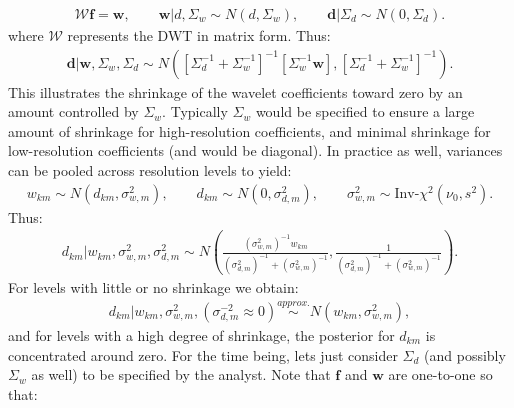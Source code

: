 \documentclass[a4paper,11pt]{article}
\newcommand{\simapprox}{\stackrel{approx.}{\sim}}
\begin{document}
\begin{align*}
 \mathcal{W}\mathbf{f} = \mathbf{w} , \qquad 
  \mathbf{w}|d,\Sigma_{w} \sim N\left(d,\Sigma_{w}\right) , \qquad
  \mathbf{d}|\Sigma_{d} \sim N\left(0,\Sigma_{d}\right) .
\end{align*}
where $\mathcal{W}$ represents the DWT in matrix form. Thus:
\begin{align*}
  \mathbf{d} | \mathbf{w}, \Sigma_{w}, \Sigma_{d} \sim
   N\left(\left[\Sigma_{d}^{-1}+\Sigma_{w}^{-1}\right]^{-1}\left[\Sigma_{w}^{-1}\mathbf{w}\right],\left[\Sigma_{d}^{-1}+\Sigma_{w}^{-1}\right]^{-1}\right) .
\end{align*}
This illustrates the shrinkage of the wavelet coefficients toward zero by an amount controlled by $\Sigma_{w}$. Typically $\Sigma_{w}$ would be specified to ensure a large amount of shrinkage for high-resolution coefficients, and minimal shrinkage for low-resolution coefficients (and would be diagonal). In practice as well, variances can be pooled across resolution levels to yield: 
\begin{align*}
  w_{km} \sim N\left(d_{km},\sigma^{2}_{w,m}\right) , \qquad
  d_{km} \sim N\left(0,\sigma^{2}_{d,m}\right) , \qquad 
  \sigma^{2}_{w,m} \sim \textrm{Inv-}\chi^{2}(\nu_{0},s^{2}) .
\end{align*}
Thus:
\begin{align*}
  d_{km} | w_{km}, \sigma^{2}_{w,m}, \sigma^{2}_{d,m} \sim
   N\left(\frac{(\sigma^{2}_{w,m})^{-1}w_{km}}{(\sigma^{2}_{d,m})^{-1}+(\sigma_{w,m}^{2})^{-1}},\frac{1}{(\sigma^{2}_{d,m})^{-1}+(\sigma_{w,m}^{2})^{-1}}\right) .
\end{align*}
For levels with little or no shrinkage we obtain:
\begin{align*}
  d_{km} | w_{km}, \sigma^{2}_{w,m}, (\sigma^{-2}_{d,m}\approx{}0) \simapprox
   N\left(w_{km},\sigma_{w,m}^{2}\right) ,
\end{align*}
and for levels with a high degree of shrinkage, the posterior for $d_{km}$ is concentrated around zero. For the time being, lets just consider $\Sigma_{d}$ (and possibly $\Sigma_{w}$ as well) to be specified by the analyst. Note that $\mathbf{f}$ and $\mathbf{w}$ are one-to-one so that:
\end{document}
